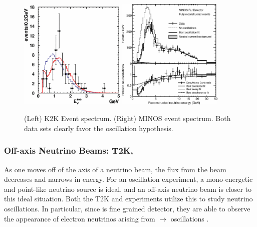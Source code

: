 \begin{figure}[htbp]
  \centering
  \includegraphics[width=0.45\textwidth]{intro_figures/k2k_oscillations.png}
  \includegraphics[width=0.45\textwidth]{intro_figures/minos_oscillations.png}
  \caption[MINOS and K2K \numu Oscillations]{(Left) K2K Event spectrum. (Right) MINOS event spectrum.  Both data sets clearly favor the oscillation hypothesis.}
  \label{fig:beam_oscillations}
\end{figure}

\subsubsection{Off-axis Neutrino Beams: T2K, \nova}
As one moves off of the axis of a neutrino beam, the flux from the beam decreases and narrows in energy.  For an oscillation experiment, a mono-energetic and point-like neutrino source is ideal, and an off-axis neutrino beam is closer to this ideal situation.  Both the T2K \cite{PhysRevLett.112.181801} and \nova \cite{PhysRevD.93.051104} experiments utilize this to study neutrino oscillations.  In particular, since \nova is fine grained detector, they are able to observe the appearance of electron neutrinos arising from \numu $\rightarrow$ \nue oscillations \cite{Adamson:2016tbq}.

